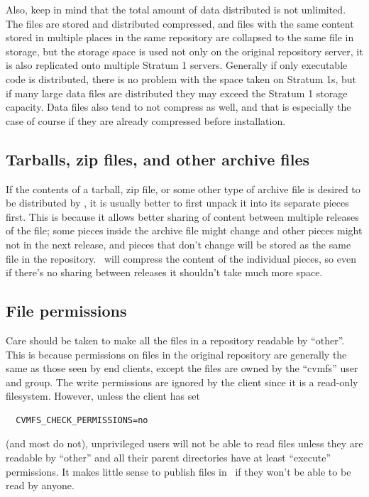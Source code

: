 Also, keep in mind that the total amount of data distributed is not unlimited.
The files are stored and distributed compressed, and files with the same content stored in multiple places in the same repository are collapsed to the same file in storage, but the storage space is used not only on the original repository server, it is also replicated onto multiple Stratum 1 servers.
Generally if only executable code is distributed, there is no problem with the space taken on Stratum 1s, but if many large data files are distributed they may exceed the Stratum 1
storage capacity.
Data files also tend to not compress as well, and that is especially the case of course if they are already compressed before installation.

\subsection{Tarballs, zip files, and other archive files}
If the contents of a tarball, zip file, or some other type of archive file is desired to be distributed by \cvmfs, it is usually better to first unpack it into its separate pieces first.
This is because it allows better sharing of content between multiple releases of the file;
some pieces inside the archive file might change and other pieces might not in the next release, and pieces that don't change will be stored as the same file in the repository.
\cvmfs\ will compress the content of the individual pieces, so even if there's no sharing between releases it shouldn't take much more space.

\subsection{File permissions}
Care should be taken to make all the files in a repository readable by ``other''.
This is because permissions on files in the original repository are generally the same as those seen by end clients, except the files are owned by the ``cvmfs'' user and group.
The write permissions are ignored by the client since it is a read-only filesystem.
However, unless the client has set
\begin{verbatim}
  CVMFS_CHECK_PERMISSIONS=no
\end{verbatim}
(and most do not), unprivileged users will not be able to read files unless they are readable by ``other'' and all their parent directories have at least ``execute'' permissions.
It makes little sense to publish files in \cvmfs\ if they won't be able to be read by anyone.

